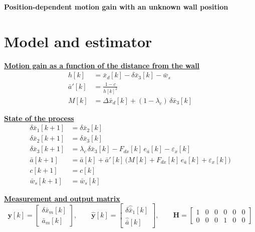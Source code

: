 \documentclass[11pt,a4paper]{ctexart}
\newcommand{\lc}{\lambda_c}
\newcommand{\bx}{\bar{x}}
\newcommand{\ba}{\bar{a}}
\newcommand{\bw}{\bar{w}}
\newcommand{\hd}[1]{\par\bigskip\noindent\underline{\textbf{#1}}}
\begin{document}
\begin{center}\textbf{\large Position-dependent motion gain with an unknown wall position}\end{center}

\section{Model and estimator}

\hd{Motion gain as a function of the distance from the wall}
\[
\begin{aligned}
h[k] &= \bx_d[k] - \delta\bx_3[k] - \bw_s \\
\ba'[k] &= \frac{1 - c}{h[k]^{2}} \\
M[k] &= \Delta\bx_d[k] + (1-\lc)\,\delta\bx_3[k]
\end{aligned}
\]

\hd{State of the process}
\[
\begin{aligned}
\delta\bx_1[k+1] &= \delta\bx_2[k] \\
\delta\bx_2[k+1] &= \delta\bx_3[k] \\
\delta\bx_3[k+1] &= \lc\,\delta\bx_3[k] - F_{dx}[k]\,e_{\ba}[k] - \varepsilon_x[k] \\
\ba[k+1] &= \ba[k] + \ba'[k]\,\big(M[k] + F_{dx}[k]\,e_{\ba}[k] + \varepsilon_x[k]\big) \\
c[k+1] &= c[k] \\
\bw_s[k+1] &= \bw_s[k]
\end{aligned}
\]

\hd{Measurement and output matrix}
\[
\mathbf{y}[k] = \begin{bmatrix} \delta\bx_m[k] \\ \ba_m[k] \end{bmatrix},
\qquad
\hat{\mathbf{y}}[k] = \begin{bmatrix} \delta\hat{\bx}_1[k] \\ \hat{\ba}[k] \end{bmatrix},
\qquad
\mathbf{H} =
\begin{bmatrix}
1 & 0 & 0 & 0 & 0 & 0 \\
0 & 0 & 0 & 1 & 0 & 0
\end{bmatrix}
\]
\end{document}
